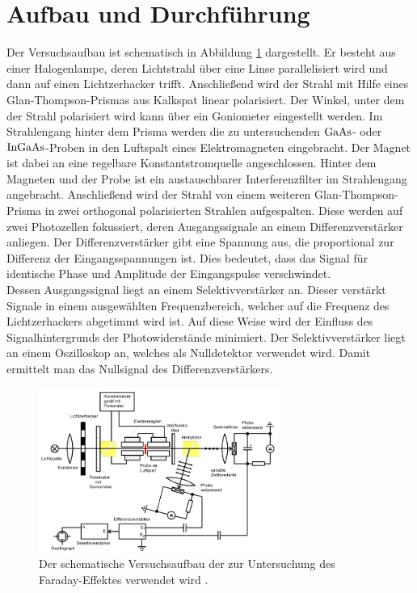 \section{Aufbau und Durchführung}

  
\noindent
Der Versuchsaufbau ist schematisch in Abbildung \ref{img:aufb} dargestellt. 
Er besteht aus einer Halogenlampe, deren Lichtstrahl über eine Linse parallelisiert wird und dann auf einen Lichtzerhacker trifft.
Anschließend wird der Strahl mit Hilfe eines Glan-Thompson-Prismas aus Kalkspat linear polarisiert. 
Der Winkel, unter dem der Strahl polarisiert wird kann über ein Goniometer eingestellt werden.
Im Strahlengang hinter dem Prisma werden die zu untersuchenden $\ce{GaAs}$- oder $\ce{InGaAs}$-Proben in den Luftspalt eines Elektromagneten eingebracht.
Der Magnet ist dabei an eine regelbare Konstantstromquelle angeschlossen. 
Hinter dem Magneten und der Probe ist ein austauschbarer Interferenzfilter im Strahlengang angebracht.
Anschließend wird der Strahl von einem weiteren Glan-Thompson-Prisma in zwei orthogonal polarisierten Strahlen aufgespalten. 
Diese werden auf zwei Photozellen fokussiert, deren Ausgangssignale an einem Differenzverstärker anliegen. 
Der Differenzverstärker gibt eine Spannung aus, die proportional zur Differenz der Eingangsspannungen ist. 
Dies bedeutet, dass das Signal für identische Phase und Amplitude der Eingangspulse verschwindet.\\
Dessen Ausgangssignal liegt an einem Selektivverstärker an. 
Dieser verstärkt Signale in einem ausgewählten Frequenzbereich, welcher auf die Frequenz des Lichtzerhackers abgetimmt wird ist.
Auf diese Weise wird der Einfluss des Signalhintergrunds der Photowiderstände minimiert. 
Der Selektivverstärker liegt an einem Oszilloskop an, welches als Nulldetektor verwendet wird. Damit ermittelt man das Nullsignal des Differenzverstärkers.\\


\begin{figure}[H]
    \centering
    \includegraphics[width=0.7\textwidth]{latex/images/Aufbau.PNG}
    \caption{Der schematische Versuchsaufbau der zur Untersuchung des Faraday-Effektes verwendet wird \protect \cite{V46}.}
    \label{img:aufb}
\end{figure}



